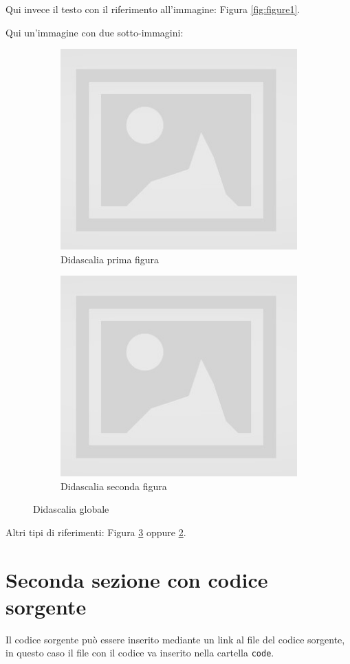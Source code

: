 Qui invece il testo con il riferimento all'immagine: Figura \ref{fig:figure1}.

Qui un'immagine con due sotto-immagini:

\begin{figure}[H]
\centering
\begin{subfigure}[b]{0.42\textwidth}
\includegraphics[width=\textwidth]{images/placeholder.jpg}
\caption{Didascalia prima figura}
\label{fig:figure2}
\end{subfigure}
\qquad
\begin{subfigure}[b]{0.42\textwidth}
\includegraphics[width=\textwidth]{images/placeholder.jpg}
\caption{Didascalia seconda figura}
\label{fig:figure3}
\end{subfigure}
\caption{Didascalia globale}
\label{fig:figures12}
\end{figure}

Altri tipi di riferimenti: Figura \ref{fig:figures12} oppure \ref{fig:figure3}.

\section{Seconda sezione con codice sorgente}

Il codice sorgente può essere inserito mediante un link al file del codice sorgente, in questo caso il file con il codice va inserito nella cartella \texttt{code}.
